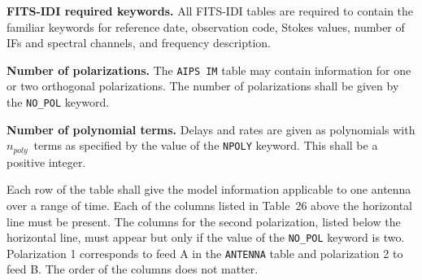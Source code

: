 \documentclass[twoside]{article}
\newcommand{\npoly}{$n_{poly}$}
\begin{document}
{\bf FITS-IDI required keywords.}  All FITS-IDI tables are required to
contain the familiar keywords for reference date, observation code,
Stokes values, number of IFs and spectral channels, and frequency
description.

{\bf Number of polarizations.}  The {\tt AIPS IM} table may contain
information for one or two orthogonal polarizations.  The number of
polarizations shall be given by the {\tt NO\_POL} keyword.

{\bf Number of polynomial terms.}  Delays and rates are given as
polynomials with \npoly\ terms as specified by the value of the
{\tt NPOLY} keyword.  This shall be a positive integer.

Each row of the table shall give the model information applicable to
one antenna over a range of time.  Each of the columns listed in
Table~26 above the horizontal line must be present.  The columns for
the second polarization, listed below the horizontal line, must appear
but only if the value of the {\tt NO\_POL} keyword is two.
Polarization 1 corresponds to feed A in the {\tt ANTENNA} table and
polarization 2 to feed B\@.  The order of the columns does not matter.
\end{document}
